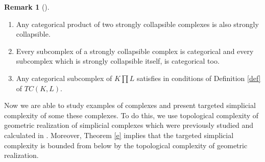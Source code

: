 \documentclass[preprint,11pt %
]{hjm1}
\theoremstyle{definition}
\newtheorem{remark}[theorem]{Remark}
\begin{document}
\begin{remark}[\cite{dis}]\label{f}
\begin{enumerate}
\item
Any categorical product of two strongly collapsible complexes is also strongly collapsible.

\item
Every subcomplex of a strongly collapsible complex is categorical and every subcomplex which is strongly collapsible itself, is categorical too.

\item
Any categorical subcomplex of $K \prod L$ satisfies in conditions of Definition \ref{def} of $TC(K, L)$.
\end{enumerate}
\end{remark}

Now we are  able to study examples of complexes and present targeted simplicial complexity  of some these complexes. To do this, we use topological complexity of geometric realization of simplicial complexes which were previously studied and calculated in \cite{rel}.
Moreover, Theorem \ref{e} implies that the targeted simplicial complexity is bounded from below by the topological complexity of geometric realization. 
\end{document}
